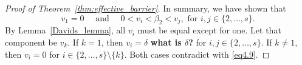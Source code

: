 \begin{proof}[Proof of Theorem~\ref{thm:effective_barrier}]
    In summary, we have shown that
    \begin{equation}\label{eq4.9}
        v_{1} = 0 \quad \text{ and } \quad 0 < v_{i} < \beta_{2} < v_{j}, \text{ for } i,j \in \{2,\dots,s\}.
    \end{equation}
    By Lemma~\ref{Davids_lemma}, all $v_{i}$ must be equal except for one.
    Let that component be $v_{k}$. If $k = 1$, then $v_{i} = \delta
   $ {\bf what is $\delta$?} for $i,j \in \{2,\dots,s\}$. If $k \neq 1
   $, then $v_{i} = 0$ for $i \in \{2,\dots,s\}\setminus\{k\}$. Both
    cases contradict with \eqref{eq4.9}. %

\end{proof}
